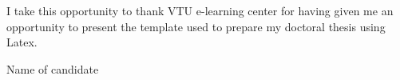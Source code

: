 \begin{acknowledgements}      
\normalsize{
I take this opportunity to thank VTU e-learning center for having given me an opportunity to present the template used to prepare my doctoral thesis using Latex.  
}
\vspace{1.5cm}

Name of candidate
\end{acknowledgements}



